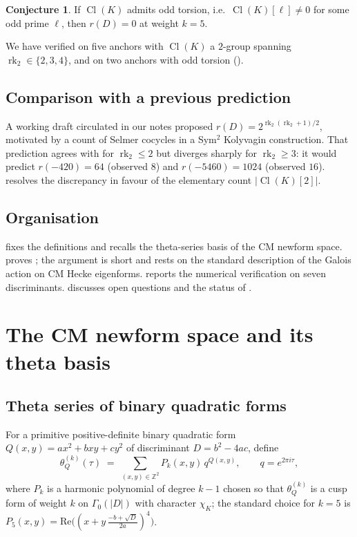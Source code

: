 \documentclass[11pt]{amsart}
\theoremstyle{definition}
\newtheorem{conjecture}[theorem]{Conjecture}
\theoremstyle{remark}
\DeclareMathOperator{\Cl}{Cl}
\DeclareMathOperator{\rk}{rk}
\newcommand{\Z}{\mathbb{Z}}
\newcommand{\chiK}{\chi_K}
\begin{document}
\begin{conjecture}\label{conj:odd}
If \(\Cl(K)\) admits odd torsion, i.e.\ \(\Cl(K)[\ell] \neq 0\) for
some odd prime \(\ell\), then \(r(D) = 0\) at weight \(k=5\).
\end{conjecture}

\noindent
We have verified  on five anchors with \(\Cl(K)\) a
\(2\)-group spanning \(\rk_2 \in \{2,3,4\}\), and  on
two anchors with odd torsion ().

\subsection{Comparison with a previous prediction}
A working draft circulated in our notes
proposed \(r(D) = 2^{\rk_2(\rk_2+1)/2}\), motivated by a count of
Selmer cocycles in a Sym\(^2\) Kolyvagin construction. That prediction
agrees with  for \(\rk_2 \le 2\) but diverges sharply
for \(\rk_2 \ge 3\): it would predict \(r(-420) = 64\) (observed \(8\))
and \(r(-5460) = 1024\) (observed \(16\)).  resolves
the discrepancy in favour of the elementary count
\(|\Cl(K)[2]|\).

\subsection{Organisation}
 fixes the definitions and recalls the theta-series
basis of the CM newform space.  proves
; the argument is short and rests on the standard
description of the Galois action on CM Hecke eigenforms.
 reports the numerical verification on seven
discriminants.  discusses open questions and the status
of .

\section{The CM newform space and its theta basis}\label{sec:def}

\subsection{Theta series of binary quadratic forms}
For a primitive positive-definite binary quadratic form
\(Q(x,y) = ax^2 + bxy + cy^2\) of discriminant \(D = b^2 - 4ac\),
define
\begin{equation}
  \theta_Q^{(k)}(\tau) \;=\; \sum_{(x,y)\in \Z^2} P_k(x,y) \,
  q^{Q(x,y)}, \qquad q = e^{2\pi i \tau},
\end{equation}
where \(P_k\) is a harmonic polynomial of degree \(k-1\) chosen so that
\(\theta_Q^{(k)}\) is a cusp form of weight \(k\) on
\(\Gamma_0(|D|)\) with character \(\chiK\); the standard choice for
\(k=5\) is \(P_5(x,y) = \mathrm{Re}\bigl( (x + y\,\tfrac{-b+\sqrt{D}}{2a})^4 \bigr)\).
\end{document}
